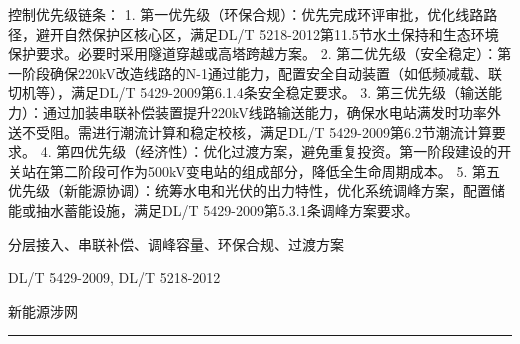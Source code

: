 \documentclass[12pt,a4paper]{ctexart}
\begin{document}
\begin{description}[leftmargin=1.5em,style=nextline,font=\normalfont]
控制优先级链条：
1. 第一优先级（环保合规）：优先完成环评审批，优化线路路径，避开自然保护区核心区，满足DL/T 5218-2012第11.5节水土保持和生态环境保护要求。必要时采用隧道穿越或高塔跨越方案。
2. 第二优先级（安全稳定）：第一阶段确保220kV改造线路的N-1通过能力，配置安全自动装置（如低频减载、联切机等），满足DL/T 5429-2009第6.1.4条安全稳定要求。
3. 第三优先级（输送能力）：通过加装串联补偿装置提升220kV线路输送能力，确保水电站满发时功率外送不受阻。需进行潮流计算和稳定校核，满足DL/T 5429-2009第6.2节潮流计算要求。
4. 第四优先级（经济性）：优化过渡方案，避免重复投资。第一阶段建设的开关站在第二阶段可作为500kV变电站的组成部分，降低全生命周期成本。
5. 第五优先级（新能源协调）：统筹水电和光伏的出力特性，优化系统调峰方案，配置储能或抽水蓄能设施，满足DL/T 5429-2009第5.3.1条调峰方案要求。
  \item[KW:] 分层接入、串联补偿、调峰容量、环保合规、过渡方案
  \item[Std:] DL/T 5429-2009, DL/T 5218-2012
  \item[Topic:] 新能源涉网
\end{description}
\vspace{4pt}
\hrule\vspace{6pt}
\end{document}
